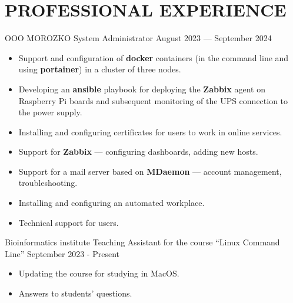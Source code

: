 \section{PROFESSIONAL EXPERIENCE}

    \job
        {OOO MOROZKO}
        {System Administrator}
        {August 2023 --- September 2024}

        \begin{itemize}
            \setlength\itemsep{-.5em}
            \item Support and configuration of \textbf{docker} containers (in the command line and using \textbf{portainer}) in a cluster of three nodes.
            \item Developing an \textbf{ansible} playbook for deploying the \textbf{Zabbix} agent on Raspberry Pi boards and subsequent monitoring of the UPS connection to the power supply.
            \item Installing and configuring certificates for users to work in online services.
            \item Support for \textbf{Zabbix} — configuring dashboards, adding new hosts.
            \item Support for a mail server based on \textbf{MDaemon} — account management, troubleshooting.
            \item Installing and configuring an automated workplace.
            \item Technical support for users.
        \end{itemize}

        \vspace{-0.5em}
    
    \job
        {Bioinformatics institute}
        {Teaching Assistant for the course “Linux Command Line”}
        {September 2023 - Present}

        \begin{itemize}
            \setlength\itemsep{-.5em}
            \item Updating the course for studying in MacOS.
            \item Answers to students' questions.
        \end{itemize}
